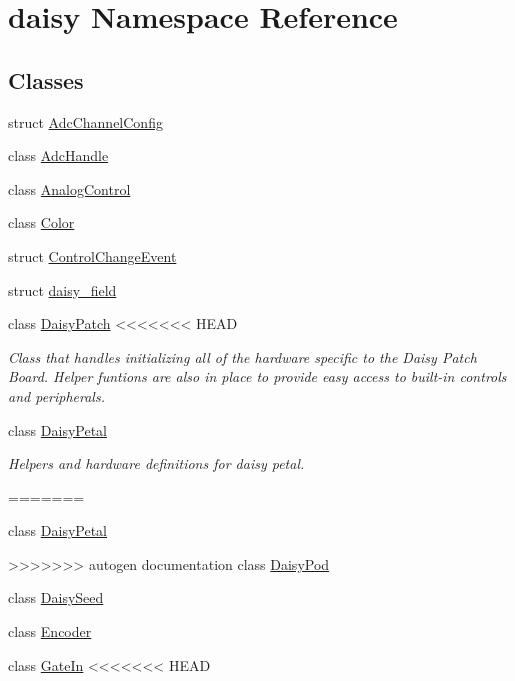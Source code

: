 \hypertarget{namespacedaisy}{}\section{daisy Namespace Reference}
\label{namespacedaisy}
\subsection*{Classes}
\begin{DoxyCompactItemize}
\item 
struct \hyperlink{structdaisy_1_1_adc_channel_config}{Adc\+Channel\+Config}
\item 
class \hyperlink{classdaisy_1_1_adc_handle}{Adc\+Handle}
\item 
class \hyperlink{classdaisy_1_1_analog_control}{Analog\+Control}
\item 
class \hyperlink{classdaisy_1_1_color}{Color}
\item 
struct \hyperlink{structdaisy_1_1_control_change_event}{Control\+Change\+Event}
\item 
struct \hyperlink{structdaisy_1_1daisy__field}{daisy\+\_\+field}
\item 
class \hyperlink{classdaisy_1_1_daisy_patch}{Daisy\+Patch}
<<<<<<< HEAD
\begin{DoxyCompactList}\small\item\em Class that handles initializing all of the hardware specific to the Daisy Patch Board. Helper funtions are also in place to provide easy access to built-\/in controls and peripherals. \end{DoxyCompactList}\item 
class \hyperlink{classdaisy_1_1_daisy_petal}{Daisy\+Petal}
\begin{DoxyCompactList}\small\item\em Helpers and hardware definitions for daisy petal. \end{DoxyCompactList}\item 
=======
\item 
class \hyperlink{classdaisy_1_1_daisy_petal}{Daisy\+Petal}
\item 
>>>>>>> autogen documentation
class \hyperlink{classdaisy_1_1_daisy_pod}{Daisy\+Pod}
\item 
class \hyperlink{classdaisy_1_1_daisy_seed}{Daisy\+Seed}
\item 
class \hyperlink{classdaisy_1_1_encoder}{Encoder}
\item 
class \hyperlink{classdaisy_1_1_gate_in}{Gate\+In}
<<<<<<< HEAD

\end{DoxyCompactItemize}
